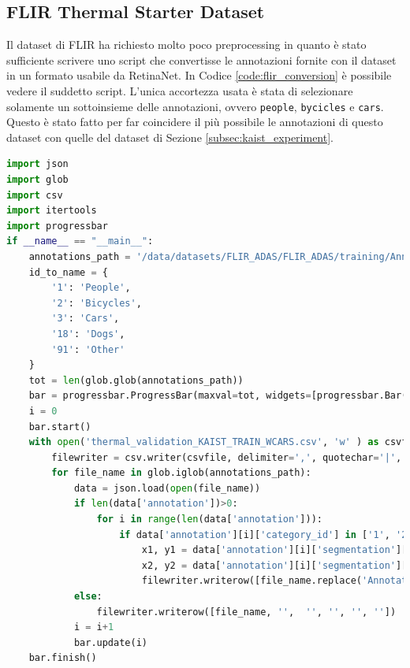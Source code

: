 \subsection{FLIR Thermal Starter Dataset}
\label{subsec:flir_experiment}
Il dataset di FLIR ha richiesto molto poco preprocessing in quanto è stato sufficiente scrivere uno script che convertisse le annotazioni fornite con il dataset in un formato usabile da RetinaNet. In Codice \ref{code:flir_conversion} è possibile vedere il suddetto script. L'unica accortezza usata è stata di selezionare solamente un sottoinsieme delle annotazioni, ovvero \texttt{people}, \texttt{bycicles} e \texttt{cars}. Questo è stato fatto per far coincidere il più possibile le annotazioni di questo dataset con quelle del dataset di Sezione \ref{subsec:kaist_experiment}.

\begin{lstlisting}[caption={Script di conversione per dataset FLIR}, language=Python, basicstyle=\tiny,label=code:flir_conversion]
import json
import glob
import csv
import itertools
import progressbar
if __name__ == "__main__":
    annotations_path = '/data/datasets/FLIR_ADAS/FLIR_ADAS/training/Annotations/*.json'
    id_to_name = {
        '1': 'People',
        '2': 'Bicycles',
        '3': 'Cars',
        '18': 'Dogs',
        '91': 'Other'
    }
    tot = len(glob.glob(annotations_path))
    bar = progressbar.ProgressBar(maxval=tot, widgets=[progressbar.Bar('=', '[', ']'), ' ', progressbar.Percentage()])
    i = 0
    bar.start()
    with open('thermal_validation_KAIST_TRAIN_WCARS.csv', 'w' ) as csvfile:
        filewriter = csv.writer(csvfile, delimiter=',', quotechar='|', quoting=csv.QUOTE_MINIMAL)
        for file_name in glob.iglob(annotations_path):
            data = json.load(open(file_name))
            if len(data['annotation'])>0:
                for i in range(len(data['annotation'])):
                    if data['annotation'][i]['category_id'] in ['1', '2', '3']:
                        x1, y1 = data['annotation'][i]['segmentation'][0][0],data['annotation'][i]['segmentation'][0][1]
                        x2, y2 = data['annotation'][i]['segmentation'][0][4],data['annotation'][i]['segmentation'][0][5]
                        filewriter.writerow([file_name.replace('Annotations', 'PreviewData')]+[x1, y1, x2, y2]+[id_to_name[data['annotation'][i]['category_id']]])
            else:
                filewriter.writerow([file_name, '',  '', '', '', ''])
            i = i+1
            bar.update(i)
    bar.finish()
  
\end{lstlisting}

